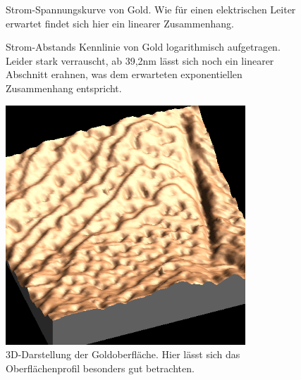 \begin{figure}[H]
	\centering
	\caption{Strom-Spannungskurve von Gold. Wie für einen elektrischen Leiter erwartet findet sich hier ein linearer Zusammenhang.}
	\label{uigold}
\end{figure}



\begin{figure}[H]
	\centering
	\caption{Strom-Abstands Kennlinie von Gold logarithmisch aufgetragen. Leider stark verrauscht, ab 39,2nm lässt sich noch ein linearer Abschnitt erahnen, was dem erwarteten exponentiellen Zusammenhang entspricht.}
	\label{uagold}
\end{figure}



\begin{figure}[H]
	\begin{center}
		\includegraphics[width=9cm]{Mess/gold3d.png}
		\caption{3D-Darstellung der Goldoberfläche. Hier lässt sich das Oberflächenprofil besonders gut betrachten.}
		\label{gold3d}
	\end{center}
\end{figure}


